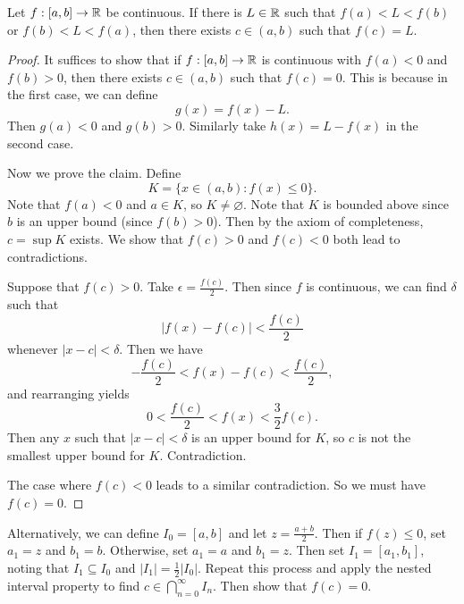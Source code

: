 \begin{theorem}
  Let $f : [a, b] \to \mathbb{R}$ be continuous. If there is
  $L \in \mathbb{R}$
  such that $f(a) < L < f(b)$ or $f(b) < L < f(a)$,
  then there exists $c \in (a, b)$ such that $f(c) = L$.
\end{theorem}

\begin{proof}[Proof]
  It suffices to show that if $f : [a, b] \to \mathbb{R}$ is
  continuous with $f(a) < 0$ and $f(b) > 0$, then
  there exists $c \in (a, b)$ such that $f(c) = 0$.
  This is because in the first case, we can define
  \[g(x) = f(x) - L.\]
  Then $g(a) < 0$ and $g(b) > 0$. Similarly take
  $h(x) = L - f(x)$ in the second case.

  Now we prove the claim. Define
  \[K = \{x \in (a, b) : f(x) \le 0\}.\]
  Note that $f(a) < 0$ and $a \in K$, so
  $K \ne \varnothing$. Note that $K$ is bounded above
  since $b$ is an upper bound (since $f(b) > 0$).
  Then by the axiom of completeness,
  $c = \sup K$ exists. We show that $f(c) > 0$ and
  $f(c) < 0$ both lead to contradictions.

  Suppose that $f(c) > 0$. Take
  $\epsilon = \frac{f(c)}{2}$. Then since $f$ is
  continuous, we can find
  $\delta$ such that
  \[|f(x) - f(c)| < \frac{f(c)}{2}\]
  whenever $|x - c| < \delta$. Then we have
  \[-\frac{f(c)}{2} < f(x) - f(c) < \frac{f(c)}{2},\]
  and rearranging yields
  \[0 < \frac{f(c)}{2} < f(x) < \frac{3}{2}f(c).\]
  Then any $x$ such that $|x - c| < \delta$ is an
  upper bound for $K$, so $c$ is not the smallest upper
  bound for $K$. Contradiction.

  The case where $f(c) < 0$ leads to a similar
  contradiction. So we must have $f(c) = 0$.
\end{proof}

\begin{remark}
  Alternatively, we can define $I_0 = [a, b]$ and let
  $z = \frac{a + b}{2}$. Then if $f(z) \le 0$,
  set $a_1 = z$ and $b_1 = b$. Otherwise, set $a_1 = a$
  and $b_1 = z$. Then set $I_1 = [a_1, b_1]$, noting
  that $I_1 \subseteq I_0$ and $|I_1| = \frac{1}{2}|I_0|$.
  Repeat this process and apply the nested interval
  property to find $c \in \bigcap_{n = 0}^\infty I_n$.
  Then show that $f(c) = 0$.
\end{remark}
